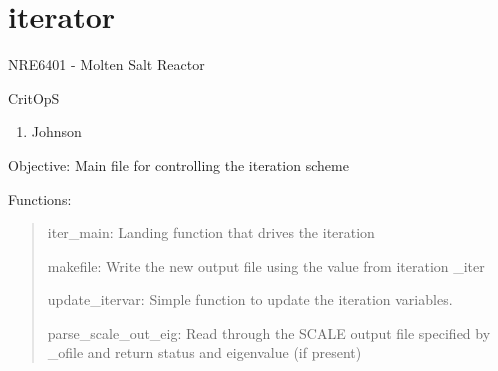 \documentclass[letterpaper,10pt,english]{sphinxmanual}
\begin{document}
\chapter{iterator}
\label{\detokenize{iterator:iterator}}\label{\detokenize{iterator:module-critops.iterator}}\label{\detokenize{iterator::doc}}
NRE6401 - Molten Salt Reactor

CritOpS
\begin{enumerate}
\item {} 
Johnson

\end{enumerate}

Objective: Main file for controlling the iteration scheme

Functions:
\begin{quote}

iter\_main: Landing function that drives the iteration

makefile: Write the new output file using the value from iteration \_iter

update\_itervar: Simple function to update the iteration variables.

parse\_scale\_out\_eig: Read through the SCALE output file specified by \_ofile and return status and eigenvalue (if present)
\end{quote}
\end{document}
